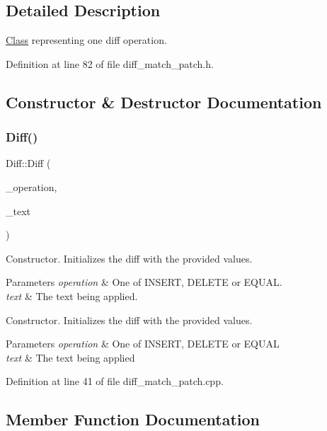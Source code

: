 \subsection{Detailed Description}
\hyperlink{struct_class}{Class} representing one diff operation. 

Definition at line 82 of file diff\+\_\+match\+\_\+patch.\+h.



\subsection{Constructor \& Destructor Documentation}
\mbox{\label{class_diff_a8fafc882c451d2b3768b0637aa0fe6b6}} 
\subsubsection{\texorpdfstring{Diff()}{Diff()}}
{\footnotesize\ttfamily Diff\+::\+Diff (\begin{DoxyParamCaption}\item[{Operation}]{\+\_\+operation,  }\item[{const Q\+String \&}]{\+\_\+text }\end{DoxyParamCaption})}

Constructor. Initializes the diff with the provided values. 
\begin{DoxyParams}{Parameters}
{\em operation} & One of I\+N\+S\+E\+RT, D\+E\+L\+E\+TE or E\+Q\+U\+AL. \\
\hline
{\em text} & The text being applied.\\
\hline
\end{DoxyParams}
Constructor. Initializes the diff with the provided values. 
\begin{DoxyParams}{Parameters}
{\em operation} & One of I\+N\+S\+E\+RT, D\+E\+L\+E\+TE or E\+Q\+U\+AL \\
\hline
{\em text} & The text being applied \\
\hline
\end{DoxyParams}


Definition at line 41 of file diff\+\_\+match\+\_\+patch.\+cpp.



\subsection{Member Function Documentation}
\mbox{\label{class_diff_a455a13550ef216f239c9195edec50b40}} 

